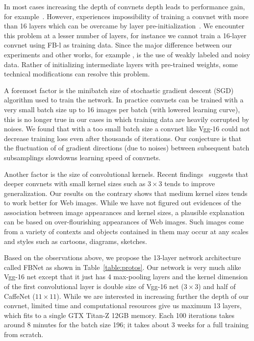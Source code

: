 \documentclass[preprint,12pt]{elsarticle}
\begin{document}
In most cases increasing the depth of convnets depth leads to performance gain, for example~\cite{DBLP:journals/corr/SimonyanZ14a,he2015delving,DBLP:journals/corr/SzegedyLJSRAEVR14}. However, \cite{DBLP:journals/corr/SimonyanZ14a} experiences impossibility of training a convnet with more than 16 layers which can be overcame by layer pre-initialization~\cite{DBLP:journals/corr/SimonyanZ14a, romero2014fitnets}. We encounter this problem at a lesser number of layers, for instance we cannot train a 16-layer convnet using FB-l as training data. Since the major difference between our experiments and other works, for example \cite{DBLP:journals/corr/SimonyanZ14a}, is the use of weakly labeled and noisy data. Rather of initializing intermediate layers with pre-trained weights, some technical modifications can resolve this problem.

A foremost factor is the minibatch size of stochastic gradient descent (SGD) algorithm used to train the network. In practice convnets can be trained with a very small batch size up to 16 images per batch (with lowered learning curve), this is no longer true in our cases in which training data are heavily corrupted by noises. We found that with a too small batch size a convnet like Vgg-16 could not decrease training loss even after thousands of iterations. Our conjecture is that the  fluctuation of of gradient directions (due to noises) between subsequent batch subsamplings slowdowns learning speed of convnets.

Another factor is the size of convolutional kernels. Recent findings~\cite{DBLP:journals/corr/SimonyanZ14a} suggests that deeper convnets with small kernel sizes such as $3\times 3$ tends to improve generalization. Our results on the contrary shows that medium kernel sizes tends to work better for Web images. While we have not figured out evidences of the association between image appearances and kernel sizes, a plausible explanation can be based on over-flourishing appearances of Web images. Such images come from a variety of contexts and objects contained in them may occur at any scales and styles such as cartoons, diagrams, sketches.

Based on the observations above, we propose the 13-layer network architecture called FBNet as shown in Table~\ref{table:protos}. Our network is very much alike Vgg-16 net  except that it just has 4 max-pooling layers and the kernel dimension of the first convolutional layer is double size of Vgg-16 net ($3 \times 3$) and half of CaffeNet ($11 \times 11$). While we are interested in increasing further the depth of our convnet, limited time and computational resources give us maximum 13 layers, which fits to a single GTX Titan-Z 12GB memory. Each 100 iterations takes around 8 minutes for the batch size 196; it takes about 3 weeks for a full training from scratch.
\end{document}
